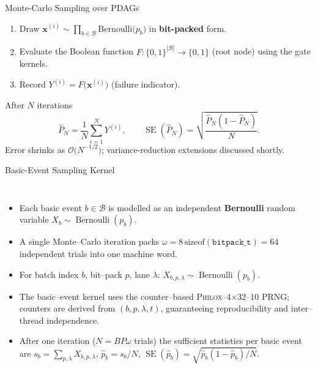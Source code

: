 \begin{frame}{Monte-Carlo Sampling over PDAGs}
  \small
  \begin{enumerate}
    \item Draw $\mathbf{x}^{(i)}\sim\prod_{b\in\mathcal{B}}\text{Bernoulli}\bigl(p_b\bigr)$ in \textbf{bit-packed} form.
    \item Evaluate the Boolean function $F\colon\{0,1\}^{|\mathcal{B}|}\!\to\!\{0,1\}$ (root node) using the gate kernels.
    \item Record $Y^{(i)} \!=\! F\bigl(\mathbf{x}^{(i)}\bigr)$ \;(failure indicator).
  \end{enumerate}
  After $N$ iterations
  \[\widehat{P}_N = \frac1N\sum_{i=1}^N Y^{(i)},\qquad \operatorname{SE}(\widehat P_N)=\sqrt{\frac{\widehat P_N(1-\widehat P_N)}{N}}.\]
  Error shrinks as $\mathcal{O}\!\bigl(N^{-1/2}\bigr)$; variance-reduction extensions discussed shortly.
\end{frame}


\begin{frame}{Basic-Event Sampling Kernel}
\begin{columns}
  \footnotesize
  \begin{itemize}
    \item Each basic event $b\in\mathcal{B}$ is modelled as an independent \textbf{Bernoulli} random variable $X_b\sim\operatorname{Bernoulli}(p_b)$.
    \item A single Monte--Carlo iteration packs $\omega = 8\,\mathrm{sizeof}(\texttt{bitpack\_t}) = 64$ independent trials into one machine word.
    \item For batch index $b$, bit--pack $p$, lane $\lambda$:
          $\displaystyle X_{b,p,\lambda}\sim\operatorname{Bernoulli}(p_b)$.
    \item The basic--event kernel uses the counter--based \textsc{Philox--4×32--10} PRNG; counters are derived from $(b,p,\lambda,t)$, guaranteeing reproducibility and inter--thread independence.
    \item After one iteration ($N = B P \omega$ trials) the sufficient statistics per basic event are
          $\displaystyle s_b = \sum_{p,\lambda} X_{b,p,\lambda}$,\;
          $\widehat p_b = s_b/N$,\;
          $\operatorname{SE}(\widehat p_b)=\sqrt{\widehat p_b(1-\widehat p_b)/N}$.
  \end{itemize}
       \par
  \end{columns}
\end{frame}


